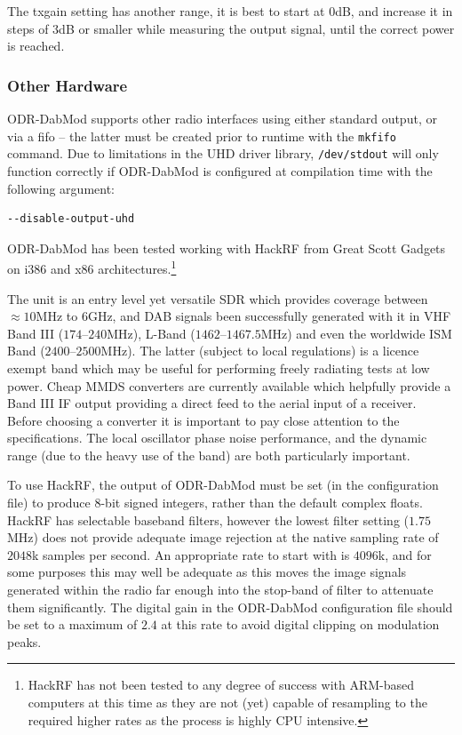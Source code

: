 The txgain setting has another range, it is best to start at $0$dB, and increase
it in steps of $3$dB or smaller while measuring the output signal, until the
correct power is reached.

\subsubsection{Other Hardware}
ODR-DabMod supports other radio interfaces using either standard output, or via
a fifo -- the latter must be created prior to runtime with the \texttt{mkfifo} command.
Due to limitations in the UHD driver library, \texttt{/dev/stdout} will only
function correctly if ODR-DabMod is configured at compilation time with the
following argument:

\begin{lstlisting}
--disable-output-uhd
\end{lstlisting}

ODR-DabMod has been tested working with HackRF from Great Scott Gadgets on i386 and
x86 architectures.\footnote{HackRF has not been tested to any degree of success
with ARM-based computers at this time as they are not (yet) capable of resampling
to the required higher rates as the process is highly CPU intensive.}

The unit is an entry level yet versatile SDR which provides coverage between
$\approx10$MHz to $6$GHz, and DAB signals been successfully generated with it in
VHF Band III ($174$--$240$MHz), L-Band ($1462$--$1467.5$MHz) and even the worldwide ISM
Band ($2400$--$2500$MHz). The latter (subject to local regulations) is a licence exempt
band which may be useful for performing freely radiating tests at low power. Cheap
MMDS converters are currently available which helpfully provide a Band III IF output
providing a direct feed to the aerial input of a receiver. Before choosing a converter
it is important to pay close attention to the specifications. The local oscillator
phase noise performance, and the dynamic range (due to the heavy use of the band) are
both particularly important.

To use HackRF, the output of ODR-DabMod must be set (in the configuration file) to
produce 8-bit signed integers, rather than the default complex floats.
HackRF has selectable baseband filters, however the lowest filter setting
($1.75$MHz) does not provide adequate image rejection at the native sampling rate of
$2048$k samples per second. An appropriate rate to start with is $4096$k, and for
some purposes this may well be adequate as this moves the image signals
generated within the radio far enough into the stop-band of filter to attenuate
them significantly. The digital gain in the ODR-DabMod configuration file should
be set to a maximum of $2.4$ at this rate to avoid digital clipping on modulation
peaks.

